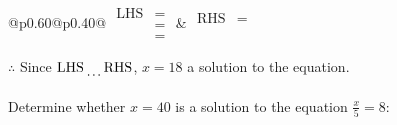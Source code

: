 \documentclass[12pt]{article}
\newcounter{minipagecount}
\begin{document}
\begin{multicols}{2}
\begin{minipage}[t]{0.40\textwidth}
    \noindent
    \renewcommand{\arraystretch}{1.3} %
    \begin{tabular}{@{}p{0.60\linewidth}@{}p{0.40\linewidth}@{}}
        \(\begin{aligned}
            \text{LHS} &=  \\
                    &=  \\
                    &= 
        \end{aligned}\) &
        \(\begin{aligned}
            \text{RHS} &= \\
                    & \\
                    &
        \end{aligned}\)
    \end{tabular}
    \renewcommand{\arraystretch}{1.0} %
    \vspace{2pt}  %

    \noindent \(\therefore\) Since \(\text{LHS} \dotuline{\hspace{5mm}} \text{RHS}\), \(x = 18\) \dotuline{\hspace{12mm}} a solution to the equation.

\end{minipage}

\vspace*{0.5ex}
\vfill{}
\columnbreak
\noindent{(\theminipagecount)}\hspace{0.1mm} %
\begin{minipage}[t]{0.40\textwidth} %

    \noindent Determine whether \(x = 40\) is a solution to the equation \(\frac{x}{5} = 8\):
    \vspace{2pt}  %


\end{minipage}
\end{multicols}
\end{document}
